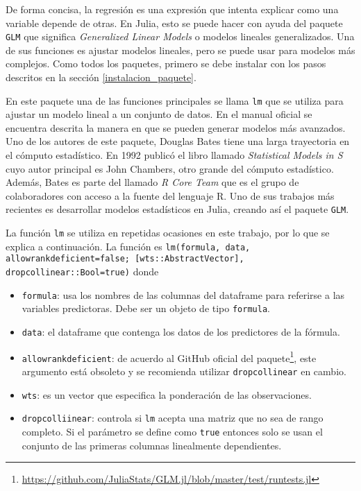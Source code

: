 De forma concisa, la regresión es una expresión que intenta explicar como una variable depende de otras. En \textsf{Julia}, esto se puede hacer con ayuda del paquete \texttt{GLM} que significa \textit{Generalized Linear Models} o modelos lineales generalizados. Una de sus funciones es ajustar modelos lineales, pero se puede usar para modelos más complejos. Como todos los paquetes, primero se debe instalar con los pasos descritos en la sección \ref{instalacion_paquete}. 

En este paquete una de las funciones principales se llama \texttt{lm} que se utiliza para ajustar un modelo lineal a un conjunto de datos. En el manual oficial \cite{glm_manual} se encuentra descrita la manera en que se pueden generar modelos más avanzados. Uno de los autores de este paquete, Douglas Bates tiene una larga trayectoria en el cómputo estadístico. En 1992 publicó el libro llamado \textit{Statistical Models in S} cuyo autor principal es John Chambers, otro grande del cómputo estadístico. Además, Bates es parte del llamado \textit{R Core Team} que es el grupo de colaboradores con acceso a la fuente del lenguaje \textsf{R}. Uno de sus trabajos más recientes es desarrollar modelos estadísticos en \textsf{Julia}, creando así el paquete \texttt{GLM}. 

La función \texttt{lm} se utiliza en repetidas ocasiones en este trabajo, por lo que se explica a continuación. La función es \texttt{lm(formula, data, allowrankdeficient=false; [wts::AbstractVector], dropcollinear::Bool=true)} donde 

\begin{itemize}
    \item \texttt{formula}: usa los nombres de las columnas del dataframe para referirse a las variables predictoras. Debe ser un objeto de tipo \texttt{formula}. 
    
    \item \texttt{data}: el dataframe que contenga los datos de los predictores de la fórmula.
    
    \item \texttt{allowrankdeficient}: de acuerdo al GitHub oficial del paquete\footnote{\url{https://github.com/JuliaStats/GLM.jl/blob/master/test/runtests.jl}}, este argumento está obsoleto y se recomienda utilizar \texttt{dropcollinear} en cambio. 
    
    \item \texttt{wts}: es un vector que especifica la ponderación de las observaciones. 
    
    \item \texttt{dropcolliinear}: controla si \texttt{lm} acepta una matriz que no sea de rango completo. Si el parámetro se define como \texttt{true} entonces solo se usan el conjunto de las primeras columnas linealmente dependientes.
\end{itemize}



